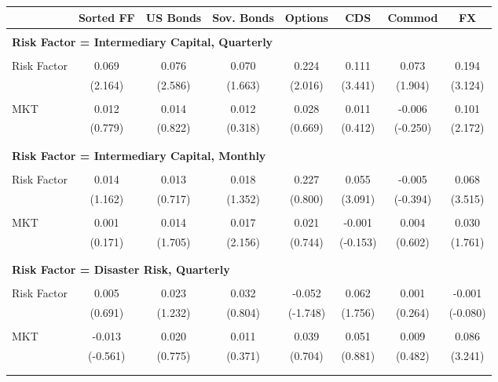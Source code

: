 \small\begin{tabular}{lccccccc}
\toprule 
  & Sorted FF & US Bonds & Sov. Bonds & Options & CDS & Commod & FX \\ 
\cline{2-8} 
\hline \\[-1.8ex] 
\multicolumn{7}{l}{\textbf{Risk Factor = Intermediary Capital, Quarterly}} \\ 
\hline \\[-1.8ex] 
Risk Factor & 0.069  & 0.076 & 0.070 & 0.224  & 0.111 & 0.073 & 0.194  \\ 
 & (2.164) & (2.586) & (1.663) & (2.016) & (3.441) & (1.904) & (3.124) \\ \\[-1.8ex] 
MKT & 0.012  & 0.014 & 0.012 & 0.028  & 0.011 & -0.006 & 0.101  \\ 
 & (0.779) & (0.822) & (0.318) & (0.669) & (0.412) & (-0.250) & (2.172) \\ \\[-1.8ex] 
\hline \\[-1.8ex] 
\multicolumn{7}{l}{\textbf{Risk Factor = Intermediary Capital, Monthly}} \\ 
\hline \\[-1.8ex] 
Risk Factor & 0.014  & 0.013 & 0.018 & 0.227  & 0.055 & -0.005 & 0.068  \\ 
 & (1.162) & (0.717) & (1.352) & (0.800) & (3.091) & (-0.394) & (3.515) \\ \\[-1.8ex] 
MKT & 0.001  & 0.014 & 0.017 & 0.021  & -0.001 & 0.004 & 0.030  \\ 
 & (0.171) & (1.705) & (2.156) & (0.744) & (-0.153) & (0.602) & (1.761) \\ \\[-1.8ex] 
\hline \\[-1.8ex] 
\multicolumn{7}{l}{\textbf{Risk Factor = Disaster Risk, Quarterly}} \\ 
\hline \\[-1.8ex] 
Risk Factor & 0.005  & 0.023 & 0.032 & -0.052  & 0.062 & 0.001 & -0.001  \\ 
 & (0.691) & (1.232) & (0.804) & (-1.748) & (1.756) & (0.264) & (-0.080) \\ \\[-1.8ex] 
MKT & -0.013  & 0.020 & 0.011 & 0.039  & 0.051 & 0.009 & 0.086  \\ 
 & (-0.561) & (0.775) & (0.371) & (0.704) & (0.881) & (0.482) & (3.241) \\ \\[-1.8ex] 
\hline \\[-1.8ex] 

\end{tabular}
